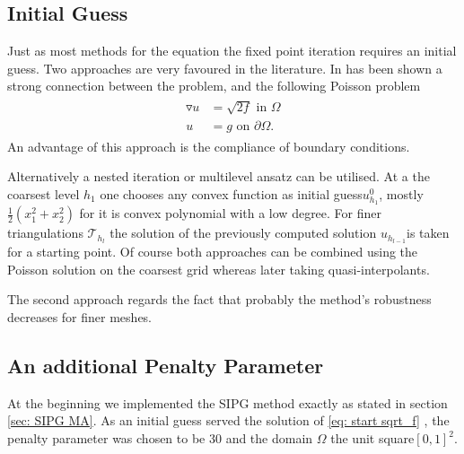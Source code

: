 \subsection{Initial Guess}\label{sec: initial guess}
Just as most methods for the \MA equation the fixed point iteration requires an initial guess. Two approaches are very favoured in the literature.
In \cite[Remark 2.1]{DG2006a} has been shown a strong connection between the \MA problem, and  the following Poisson problem
\begin{align}
	\begin{split}
	\triangledown u &= \sqrt{2f} \text{ in } \Omega \\ 
	u &= g \text{ on }\partial \Omega.
	\end{split}\label{eq: start sqrt_f}
\end{align}
An advantage of this approach is the compliance of boundary conditions.

Alternatively a nested iteration or multilevel ansatz can be utilised. At a the coarsest level $h_1$ one chooses any convex function as initial guess$u^0_{h_1}$, mostly $\frac 1 2 ({x_1^2} + {x_2^2}) $ for it is convex polynomial with a low degree. For finer triangulations $\mathcal{T}_{h_{l}}$ the solution of the previously computed solution $u_{h_{l-1}}$is taken for a starting point. Of course both approaches can be combined using the Poisson solution on the coarsest grid whereas later taking quasi-interpolants.

The second approach regards the fact that probably the method's robustness decreases for finer meshes.


\subsection{An additional Penalty Parameter}
At the beginning we implemented the SIPG method exactly as stated in section \ref{sec: SIPG MA}.
As an initial guess served the solution of \eqref{eq: start sqrt_f} , the penalty parameter was chosen to be 30 and the domain $\Omega$ the unit square$[0,1]^2$.

